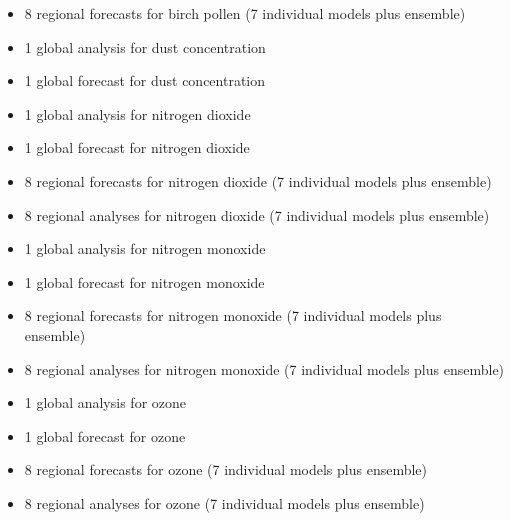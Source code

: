 \documentclass[9pt]{report}
\begin{document}
\begin{itemize}[noitemsep,topsep=\mdcompacttopsep]%

\item{}8 regional forecasts for birch pollen (7 individual models plus ensemble)%

\item{}1 global analysis for dust concentration%

\item{}1 global forecast for dust concentration%

\item{}1 global analysis for nitrogen dioxide%

\item{}1 global forecast for nitrogen dioxide%

\item{}8 regional forecasts for nitrogen dioxide (7 individual models plus ensemble)%

\item{}8 regional analyses for nitrogen dioxide (7 individual models plus ensemble)%

\item{}1 global analysis for nitrogen monoxide%

\item{}1 global forecast for nitrogen monoxide%

\item{}8 regional forecasts for nitrogen monoxide (7 individual models plus ensemble)%

\item{}8 regional analyses for nitrogen monoxide (7 individual models plus ensemble)%

\item{}1 global analysis for ozone%

\item{}1 global forecast for ozone%

\item{}8 regional forecasts for ozone (7 individual models plus ensemble)%

\item{}8 regional analyses for ozone (7 individual models plus ensemble)%
\end{itemize}%
\end{document}

